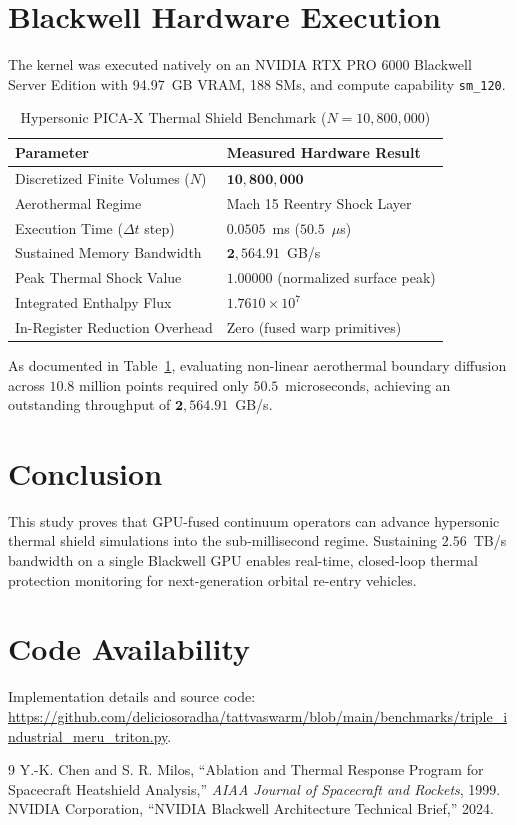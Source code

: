 \documentclass[10pt,twocolumn]{article}
\begin{document}
\section{Blackwell Hardware Execution}
The kernel was executed natively on an NVIDIA RTX PRO 6000 Blackwell Server Edition with 94.97~GB VRAM, 188 SMs, and compute capability \texttt{sm\_120}.

\begin{table}[h]
\centering
\small
\caption{Hypersonic PICA-X Thermal Shield Benchmark ($N=10,800,000$)}
\label{tab:aero_metrics}
\begin{tabular}{ll}
\toprule
\textbf{Parameter} & \textbf{Measured Hardware Result} \\
\midrule
Discretized Finite Volumes ($N$) & $\mathbf{10,800,000}$ \\
Aerothermal Regime & Mach 15 Reentry Shock Layer \\
Execution Time ($\Delta t$ step) & $\mathbf{0.0505}$~ms ($\mathbf{50.5}$~$\mu$s) \\
Sustained Memory Bandwidth & $\mathbf{2,564.91}$~GB/s \\
Peak Thermal Shock Value & $1.00000$ (normalized surface peak) \\
Integrated Enthalpy Flux & $1.7610\times 10^7$ \\
In-Register Reduction Overhead & Zero (fused warp primitives) \\
\bottomrule
\end{tabular}
\end{table}

As documented in Table~\ref{tab:aero_metrics}, evaluating non-linear aerothermal boundary diffusion across $10.8$ million points required only $\mathbf{50.5}$~microseconds, achieving an outstanding throughput of $\mathbf{2,564.91}$~GB/s.

\section{Conclusion}
This study proves that GPU-fused continuum operators can advance hypersonic thermal shield simulations into the sub-millisecond regime. Sustaining $2.56$~TB/s bandwidth on a single Blackwell GPU enables real-time, closed-loop thermal protection monitoring for next-generation orbital re-entry vehicles.

\section*{Code Availability}
Implementation details and source code: \url{https://github.com/deliciosoradha/tattvaswarm/blob/main/benchmarks/triple_industrial_meru_triton.py}.

\begin{thebibliography}{9}
Y.-K. Chen and S. R. Milos, ``Ablation and Thermal Response Program for Spacecraft Heatshield Analysis,'' \textit{AIAA Journal of Spacecraft and Rockets}, 1999.
NVIDIA Corporation, ``NVIDIA Blackwell Architecture Technical Brief,'' 2024.
\end{thebibliography}
\end{document}
